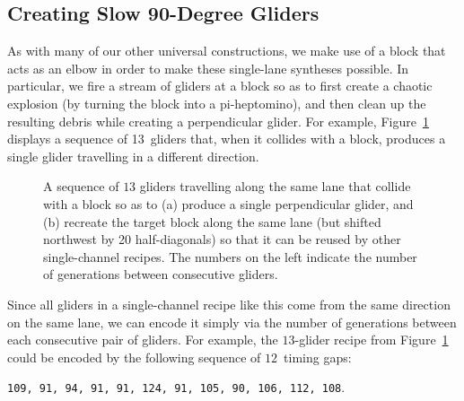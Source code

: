 \subsection{Creating Slow 90-Degree Gliders}\label{sec:single_channel_create_perp_glider}

As with many of our other universal constructions, we make use of a block that acts as an elbow in order to make these single-lane syntheses possible. In particular, we fire a stream of gliders at a block so as to first create a chaotic explosion (by turning the block into a pi-heptomino), and then clean up the resulting debris while creating a perpendicular glider. For example, Figure~\ref{fig:90_degree_first_example} displays a sequence of 13~gliders that, when it collides with a block, produces a single glider travelling in a different direction.

\begin{figure}[!htb]
	\centering
	\caption{A sequence of $13$ gliders travelling along the same lane that collide with a block so as to (a) produce a single perpendicular glider, and (b) recreate the target block along the same lane (but shifted northwest by 20 half-diagonals) so that it can be reused by other single-channel recipes. The numbers on the left indicate the number of generations between consecutive gliders.}\label{fig:90_degree_first_example}
\end{figure}

Since all gliders in a single-channel recipe like this come from the same direction on the same lane, we can encode it simply via the number of generations between each consecutive pair of gliders. For example, the $13$-glider recipe from Figure~\ref{fig:90_degree_first_example} could be encoded by the following sequence of $12$~timing gaps:
\begin{center}
	\texttt{109, 91, 94, 91, 91, 124, 91, 105, 90, 106, 112, 108}.
\end{center}

